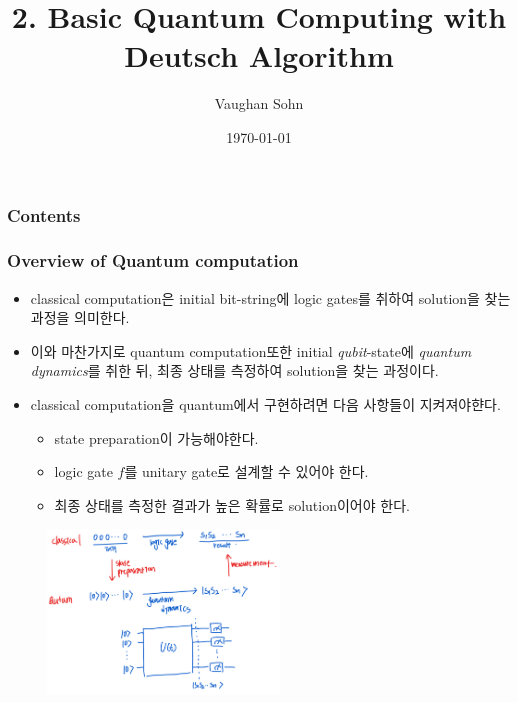 \documentclass[9pt]{beamer}
\title{2. Basic Quantum Computing with Deutsch Algorithm}
\date{\today}
\author{Vaughan Sohn}
\begin{document}
    \maketitle
    

    \begin{frame}
        \frametitle{Contents}
        \tableofcontents
    \end{frame}

    \begin{frame}
        \frametitle{Overview of Quantum computation}
        \begin{itemize}
            \item classical computation은 initial bit-string에 logic gates를 취하여 solution을 찾는 과정을 의미한다.
            \item 이와 마찬가지로 quantum computation또한 initial \textit{qubit}-state에 \textit{quantum dynamics}를 취한 뒤, 최종 상태를 측정하여 solution을 찾는 과정이다.
            \item classical computation을 quantum에서 구현하려면 다음 사항들이 지켜져야햔다.
            \begin{itemize}
                \item state preparation이 가능해야한다.
                \item logic gate $f$를 unitary gate로 설계할 수 있어야 한다.
                \item 최종 상태를 측정한 결과가 높은 확률로 solution이어야 한다.
            \end{itemize}
        \end{itemize}
        \begin{figure}
            \includegraphics[width=0.55\textwidth]{image/L2_overview.png}
        \end{figure}
        \vspace{-0.3cm}
    \end{frame}
\end{document}
